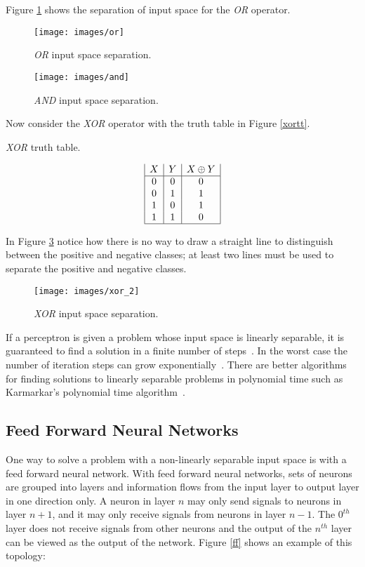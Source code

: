 Figure \ref{ors} shows the separation of input space for the {\it OR} operator.

\begin{figure}[htb!]
  \centering
  \texttt{[image: images/or]}
  \caption{{\it OR} input space separation.}
  \label{ors}
\end{figure}

\begin{figure}[htb!]
  \centering
  \texttt{[image: images/and]}
  \caption{{\it AND} input space separation.}
  \label{ands}
\end{figure}

Now consider the {\it XOR} operator with the truth table in Figure
\ref{xortt}.

\begin{table}[h!]
\caption{{\it XOR} truth table.}
\label{xortt}
\begin{displaymath}
\begin{array}{|c|c|c|}
   X
 & Y
 & X \oplus Y
\\
\hline
0 & 0 & 0\\
0 & 1 & 1\\
1 & 0 & 1\\
1 & 1 & 0\\
\hline
\end{array}
\end{displaymath}
\end{table}

In Figure \ref{xorss} notice how there is no way to draw a straight
line to distinguish between the positive and negative classes; at least two lines must be used to separate the positive and negative classes.

\begin{figure}[htb!]
  \centering
  \texttt{[image: images/xor\_2]}
  \caption{{\it XOR} input space separation.}
  \label{xorss}
\end{figure}

If a perceptron is given a problem whose input space is linearly
separable, it is guaranteed to find a solution in a finite number of
steps~\cite{patternRecognition1}. 
In the worst case the number of iteration steps can grow
exponentially~\cite[95-96]{rojas}.
There are better algorithms for finding solutions to linearly separable problems in
polynomial time such as Karmarkar's polynomial time
algorithm~\cite{karmarkar}.

\subsection{Feed Forward Neural Networks} 
One way to solve a problem with a non-linearly separable input space
is with a feed forward neural network.
With feed forward neural networks, sets of neurons are grouped into
layers and information flows from the input layer to output layer in one direction only.
A neuron in layer $n$ may only send signals to neurons in layer $n+1$, and it may only receive signals from neurons in layer $n-1$.
The $0^{th}$ layer does not receive signals from other neurons and the output of the $n^{th}$ layer can be viewed as the output of the network.
Figure \ref{ff} shows an example of this topology:

